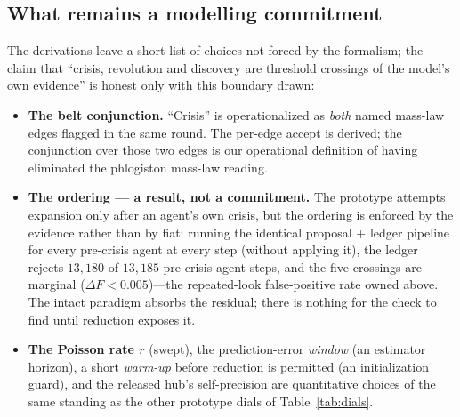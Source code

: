 \subsection{What remains a modelling commitment}

The derivations leave a short list of choices not forced by the formalism; the claim that
``crisis, revolution and discovery are threshold crossings of the model's own evidence'' is
honest only with this boundary drawn:

\begin{itemize}
\item \textbf{The belt conjunction.} ``Crisis'' is operationalized as \emph{both} named
mass-law edges flagged in the same round. The per-edge accept is derived; the conjunction over
those two edges is our operational definition of having eliminated the phlogiston mass-law
reading.
\item \textbf{The ordering --- a result, not a commitment.} The prototype attempts expansion
only after an agent's own crisis, but the ordering is enforced by the evidence rather than by
fiat: running the identical proposal + ledger pipeline for every pre-crisis agent at every
step (without applying it), the ledger rejects $13{,}180$ of $13{,}185$ pre-crisis
agent-steps, and the five crossings are marginal ($\Delta F < 0.005$)---the repeated-look
false-positive rate owned above. The intact paradigm absorbs the residual; there is nothing
for the check to find until reduction exposes it.
\item \textbf{The Poisson rate $r$} (swept), the prediction-error \emph{window} (an estimator
horizon), a short \emph{warm-up} before reduction is permitted (an initialization guard), and
the released hub's self-precision are quantitative choices of the same standing as the other
prototype dials of Table~\ref{tab:dials}.
\end{itemize}

